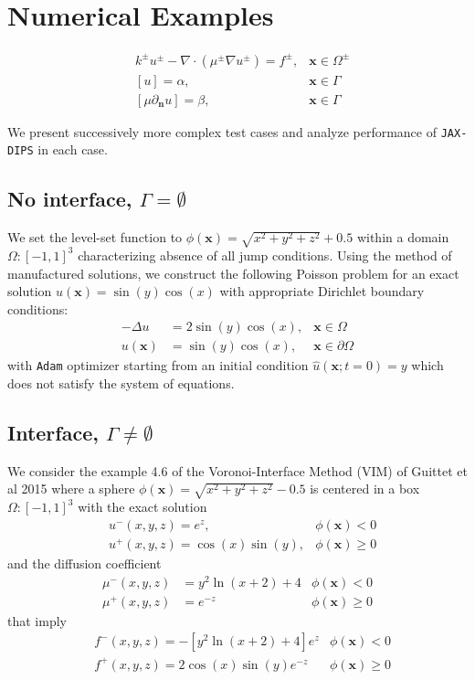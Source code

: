 \documentclass{elsarticle}
\begin{document}
\section{Numerical Examples}

\begin{align*}
	 & k^{\pm}u^{\pm} - \nabla \cdot (\mu^{\pm}\nabla u^\pm)=f^{\pm}, & \mathbf{x}\in\Omega^\pm \\
	 & [u]=\alpha,                                                    & \mathbf{x} \in \Gamma   \\
	 & [\mu \partial_{\mathbf{n}}u]=\beta,                            & \mathbf{x} \in \Gamma
\end{align*}



We present successively more complex test cases and analyze performance of \texttt{JAX-DIPS} in each case.


\subsection{No interface, $\Gamma=\emptyset $}
We set the level-set function to $\phi(\mathbf{x})=\sqrt{x^2 + y^2 + z^2} + 0.5$ within a domain $\Omega:[-1,1]^3$ characterizing absence of all jump conditions. Using the method of manufactured solutions, we construct the following Poisson problem for an exact solution $u(\mathbf{x}) = \sin(y)\cos(x)$ with appropriate Dirichlet boundary conditions:
\begin{align*}
	 - \Delta u &=2\sin(y)\cos(x), & \mathbf{x}\in\Omega\\
	 u(\mathbf{x}) &= \sin(y)\cos(x), &\mathbf{x}\in \partial \Omega
\end{align*}
with \texttt{Adam} optimizer starting from an initial condition $\hat{u}(\mathbf{x};t=0)=y$ which does not satisfy the system of equations.



\subsection{Interface, $\Gamma\neq \emptyset$}
We consider the example 4.6 of the Voronoi-Interface Method (VIM) of Guittet et al 2015 \cite{guittet2015solving} where a sphere $\phi(\mathbf{x})=\sqrt{x^2 + y^2 + z^2} - 0.5$ is centered in a box $\Omega:[-1,1]^3$ with the exact solution
\begin{align*}
& u^-(x,y,z)=e^{z}, & \phi(\mathbf{x})<0\\
& u^+(x,y,z)=\cos(x)\sin(y), & \phi(\mathbf{x})\ge 0
\end{align*}
and the diffusion coefficient
\begin{align*}
\mu^-(x,y,z)&=y^2 \ln(x+2) + 4 &\phi(\mathbf{x})<0 \\
\mu^+(x,y,z)&=e^{-z} &\phi(\mathbf{x})\ge 0 
\end{align*}
that imply
\begin{align*}
&f^-(x,y,z)=-[y^2\ln(x+2) + 4] e^{z} &\phi(\mathbf{x})< 0\\
&f^+(x,y,z)=2\cos(x)\sin(y)e^{-z} &\phi(\mathbf{x})\ge 0
\end{align*}
\end{document}

